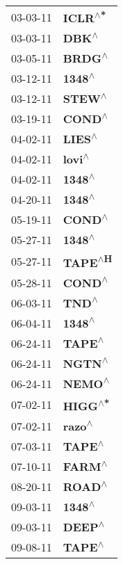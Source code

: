 \begin{supertabular}{p{0.08\textwidth}p{0.2\textwidth}}
 03-03-11 &   \textbf{ICLR\textsuperscript{$\wedge$*}} \\
 03-03-11 &     \textbf{DBK\textsuperscript{$\wedge$}} \\
 03-05-11 &    \textbf{BRDG\textsuperscript{$\wedge$}} \\
 03-12-11 &    \textbf{1348\textsuperscript{$\wedge$}} \\
 03-12-11 &    \textbf{STEW\textsuperscript{$\wedge$}} \\
 03-19-11 &    \textbf{COND\textsuperscript{$\wedge$}} \\
 04-02-11 &    \textbf{LIES\textsuperscript{$\wedge$}} \\
 04-02-11 &    \textbf{lovi\textsuperscript{$\wedge$}} \\
 04-02-11 &    \textbf{1348\textsuperscript{$\wedge$}} \\
 04-20-11 &    \textbf{1348\textsuperscript{$\wedge$}} \\
 05-19-11 &    \textbf{COND\textsuperscript{$\wedge$}} \\
 05-27-11 &    \textbf{1348\textsuperscript{$\wedge$}} \\
 05-27-11 &   \textbf{TAPE\textsuperscript{$\wedge$H}} \\
 05-28-11 &    \textbf{COND\textsuperscript{$\wedge$}} \\
 06-03-11 &     \textbf{TND\textsuperscript{$\wedge$}} \\
 06-04-11 &    \textbf{1348\textsuperscript{$\wedge$}} \\
 06-24-11 &    \textbf{TAPE\textsuperscript{$\wedge$}} \\
 06-24-11 &    \textbf{NGTN\textsuperscript{$\wedge$}} \\
 06-24-11 &    \textbf{NEMO\textsuperscript{$\wedge$}} \\
 07-02-11 &   \textbf{HIGG\textsuperscript{$\wedge$*}} \\
 07-02-11 &    \textbf{razo\textsuperscript{$\wedge$}} \\
 07-03-11 &    \textbf{TAPE\textsuperscript{$\wedge$}} \\
 07-10-11 &    \textbf{FARM\textsuperscript{$\wedge$}} \\
 08-20-11 &    \textbf{ROAD\textsuperscript{$\wedge$}} \\
 09-03-11 &    \textbf{1348\textsuperscript{$\wedge$}} \\
 09-03-11 &    \textbf{DEEP\textsuperscript{$\wedge$}} \\
 09-08-11 &    \textbf{TAPE\textsuperscript{$\wedge$}} \\

\end{supertabular}
